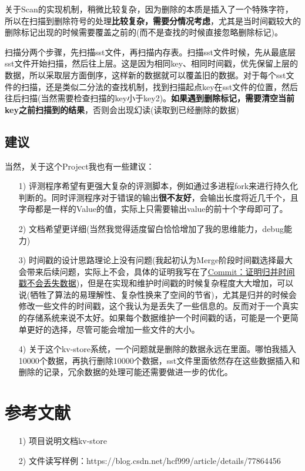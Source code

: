 \documentclass[fontset=windows]{article}
\begin{document}
关于Scan的实现机制，稍微比较复杂，因为删除的本质是插入了一个特殊字符，所以在扫描到删除符号的处理\textbf{比较复杂，需要分情况考虑}，尤其是当时间戳较大的删除标记出现的时候需要覆盖之前的(而不是查找的时候直接忽略删除标记)。

扫描分两个步骤，先扫描sst文件，再扫描内存表。扫描sst文件时候，先从最底层sst文件开始扫描，然后往上层。这是因为相同key、相同时间戳，优先保留上层的数据，所以采取层方面倒序，这样新的数据就可以覆盖旧的数据。对于每个sst文件的扫描，还是类似二分法的查找机制，找到扫描起点key在sst文件的位置，然后往后扫描(当然需要检查扫描的key小于key2)。\textbf{如果遇到删除标记，需要清空当前key之前扫描到的结果}，否则会出现幻读(读取到已经删除的数据)

\subsection{建议}
当然，关于这个Project我也有一些建议：
\begin{itemize}
    \item [1)] 评测程序希望有更强大复杂的评测脚本，例如通过多进程fork来进行持久化判断的。同时评测程序对于错误的输出\textbf{很不友好}，会输出长度将近几千个，且字母都是一样的Value的值，实际上只需要输出value的前十个字母即可了。
    \item [2)] 文档希望更详细(当然我觉得适度留白恰恰增加了我的思维能力，debug能力)
    
    \item [3)] 时间戳的设计思路理论上没有问题(我起初认为Merge阶段时间戳选择最大会带来后续问题，实际上不会，具体的证明我写在了\href{https://github.com/Musicminion/2022-2023-2-Advanced-Data-Structure/commit/63726308274f04282bbb7ae7b08928f4a87f2263#commitcomment-104587485}{\underline{Commit：证明归并时间戳不会丢失数据}})，但是在实现和维护时间戳的时候复杂程度大大增加，可以说(牺牲了算法的易理解性、复杂性换来了空间的节省)，尤其是归并的时候会修改一些文件的时间戳，这个我认为是丢失了一些信息的。反而对于一个真实的存储系统来说不太好。如果每个数据维护一个时间戳的话，可能是一个更简单更好的选择，尽管可能会增加一些文件的大小。 
    
    \item [4)] 关于这个kv-store系统，一个问题就是删除的数据永远在里面。哪怕我插入10000个数据，再执行删除10000个数据，sst文件里面依然存在这些数据插入和删除的记录，冗余数据的处理可能还需要做进一步的优化。
\end{itemize}

\section{参考文献}
\begin{itemize}
    \item [1)] 项目说明文档kv-store
    \item [2)] 文件读写样例：https://blog.csdn.net/hcf999/article/details/77864456
\end{itemize}
\end{document}
